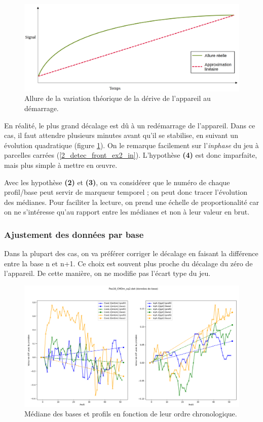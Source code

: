 \documentclass[12pt]{article}
\begin{document}
    \begin{figure}[ht!]
        \centering
        \includegraphics[width=\textwidth]{Images/Base_Vrai_Evol.png}  
        \caption{Allure de la variation théorique de la dérive de l'appareil au démarrage.}
        \label{fig:2_ep_vt}
    \end{figure}

    En réalité, le plus grand décalage est dû à un redémarrage de l'appareil. Dans ce cas, il faut attendre plusieurs minutes avant qu'il se stabilise, en suivant un évolution quadratique (figure \ref{fig:2_ep_vt}). On le remarque facilement sur l'\textit{inphase} du jeu à parcelles carrées (\ref{2_detec_front_ex2_in}). L'hypothèse \textbf{(4)} est donc imparfaite, mais plus simple à mettre en œuvre.

    Avec les hypothèse \textbf{(2)} et \textbf{(3)}, on va considérer que le numéro de chaque profil/base peut servir de marqueur temporel ; on peut donc tracer l'évolution des médianes. Pour faciliter la lecture, on prend une échelle de proportionalité car on ne s'intéresse qu'au rapport entre les médianes et non à leur valeur en brut.

\subsubsection{Ajustement des données par base}

    Dans la plupart des cas, on va préférer corriger le décalage en faisant la différence entre la base n et n+1. Ce choix est souvent plus proche du décalage du zéro de l'appareil. De cette manière, on ne modifie pas l'écart type du jeu.

    \begin{figure}[ht!]
        \centering
        \includegraphics[width=\textwidth]{Images/Base_diff_Avant_sq2.png}  
        \caption{Médiane des bases et profils en fonction de leur ordre chronologique.}
    \end{figure}
\end{document}
